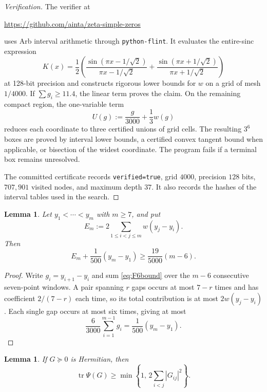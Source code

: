 \documentclass[11pt]{article}
\newtheorem{lemma}[theorem]{Lemma}
\DeclareMathOperator{\tr}{tr}
\begin{document}
\begin{proof}[Verification]
The verifier at
\begin{center}
 \url{https://github.com/ainta/zeta-simple-zeros}
\end{center}
uses Arb interval arithmetic through \texttt{python-flint}.  It evaluates
the entire-sinc expression
\[
 K(x)=\frac12\left(
 \frac{\sin(\pi x-1/\sqrt2)}{\pi x-1/\sqrt2}
 +\frac{\sin(\pi x+1/\sqrt2)}{\pi x+1/\sqrt2}
 \right)
\]
at 128-bit precision and constructs rigorous lower bounds for $w$ on a grid
of mesh $1/4000$.  If $\sum g_i\ge11.4$, the linear term proves the claim.
On the remaining compact region, the one-variable term
\[
 U(g):=\frac g{3000}+\frac13w(g)
\]
reduces each coordinate to three certified unions of grid cells.  The
resulting $3^6$ boxes are proved by interval lower bounds, a certified convex
tangent bound when applicable, or bisection of the widest coordinate.  The
program fails if a terminal box remains unresolved.

The committed certificate records \texttt{verified=true}, grid $4000$,
precision $128$ bits, $707{,}901$ visited nodes, and maximum depth $37$.
It also records the hashes of the interval tables used in the search.
\end{proof}

\begin{lemma}\label{lem:block-energy}
Let $y_1<\cdots<y_m$ with $m\ge7$, and put
\[
 E_m:=2\sum_{1\le i<j\le m}w(y_j-y_i).
\]
Then
\begin{equation}\label{eq:block-energy}
 E_m+\frac1{500}(y_m-y_1)
 \ge\frac{19}{5000}(m-6).
\end{equation}
\end{lemma}

\begin{proof}
Write $g_i=y_{i+1}-y_i$ and sum \eqref{eq:F6bound} over the $m-6$
consecutive seven-point windows.  A pair spanning $r$ gaps occurs at most
$7-r$ times and has coefficient $2/(7-r)$ each time, so its total
contribution is at most $2w(y_j-y_i)$.  Each single gap occurs at most six
times, giving at most
\[
 \frac6{3000}\sum_{i=1}^{m-1}g_i
 =\frac1{500}(y_m-y_1).
\]
\end{proof}

\begin{lemma}\label{lem:block-defect}
If $G\succeq0$ is Hermitian, then
\begin{equation}\label{eq:block-defect}
 \tr\Psi(G)
 \ge\min\left\{1,\,2\sum_{i<j}|G_{ij}|^2\right\}.
\end{equation}
\end{lemma}
\end{document}
